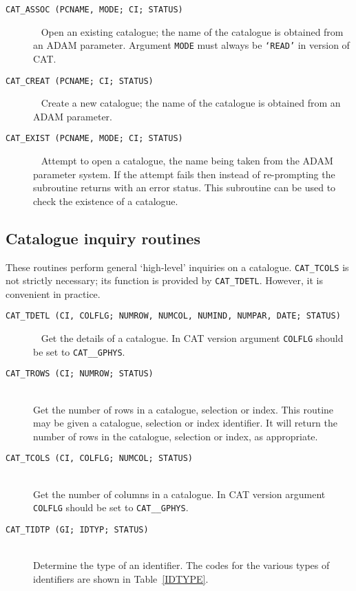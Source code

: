 \begin{description}

  \item[ {\tt CAT\_ASSOC (PCNAME, MODE; CI; STATUS) } ] ~
  \newline Open an existing catalogue; the name of the catalogue is
   obtained from an ADAM parameter. Argument {\tt MODE} must always
   be {\tt `READ'} in version \CATversion of CAT.

  \item[ {\tt CAT\_CREAT (PCNAME; CI; STATUS) } ] ~
  \newline Create a new catalogue; the name of the catalogue is obtained
   from an ADAM parameter.

  \item[ {\tt CAT\_EXIST (PCNAME, MODE; CI; STATUS) } ] ~
  \newline Attempt to open a catalogue, the name being taken from the
   ADAM parameter system. If the attempt fails then instead of
   re-prompting the subroutine returns with an error status. This
   subroutine can be used to check the existence of a catalogue.

\end{description}


\subsection{Catalogue inquiry routines}

These routines perform general `high-level' inquiries on a catalogue.
{\tt CAT\_TCOLS} is not strictly necessary; its function is
provided by {\tt CAT\_TDETL}. However, it is convenient in practice.

\begin{description}

  \item[ {\tt CAT\_TDETL (CI, COLFLG; NUMROW, NUMCOL, NUMIND, NUMPAR,
   DATE; STATUS) } ] ~
  \newline Get the details of a catalogue. In CAT version \CATversion
   argument {\tt COLFLG} should be set to {\tt CAT\_\_GPHYS}.

  \item[ {\tt CAT\_TROWS (CI; NUMROW; STATUS) } ] ~ \\
   Get the number of rows in a catalogue, selection or index. This
   routine may be given a catalogue, selection or index identifier.  It
   will return the number of rows in the catalogue, selection or index,
   as appropriate.

  \item[ {\tt CAT\_TCOLS (CI, COLFLG; NUMCOL; STATUS) } ] ~ \\
   Get the number of columns in a catalogue. In CAT version \CATversion
   argument {\tt COLFLG} should be set to {\tt CAT\_\_GPHYS}.

  \item[ {\tt CAT\_TIDTP (GI; IDTYP; STATUS) } ] ~ \\
   Determine the type of an identifier. The codes for the various types
   of identifiers are shown in Table~\ref{IDTYPE}.

\end{description}

